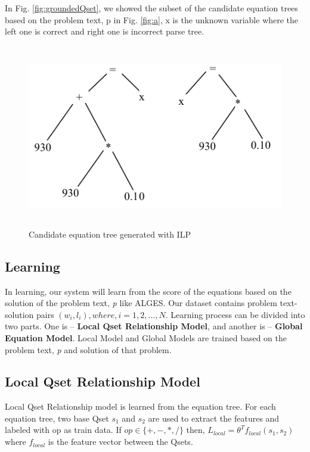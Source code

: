 \documentclass[document.tex]{subfiles}
\begin{document}
In Fig. \ref{fig:groundedQset}, we showed the subset of the candidate equation trees based on the problem text, p in Fig. \ref{fig:a}, x is the unknown variable where the left one is correct and right one is incorrect parse tree.
\begin{figure}[H]
	\begin{center}
		\includegraphics[height=8cm]{imgs/tree.png}
	\end{center}
	\caption{Candidate equation tree generated with ILP}
	\label{fig:tree}
\end{figure}

\subsection{Learning}
In learning, our system will learn from the score of the equations based on the solution of the problem text, \textit{p} like ALGES. Our dataset contains problem text-solution pairs $ (w_ i ,l_ i), where, i = 1,2, ...,N$. Learning process can be divided into two parts. One is – \textbf{Local Qset Relationship Model}, and another is – \textbf{Global Equation Model}. Local Model and Global Models are trained based on the problem text, \textit{p} and solution of that problem.

\subsection{Local Qset Relationship Model}
Local Qset Relationship model is learned from the equation tree. For each equation tree, two base Qset $s_1$ and $s_2$ are used to extract the features and labeled with op as train data. If $op \in \{+, - , *, /\}$ then, $L_{local} = \theta^T f_{local}(s_1, s_2)$ where $f_{local}$ is the feature vector between the Qsets.
\end{document}
